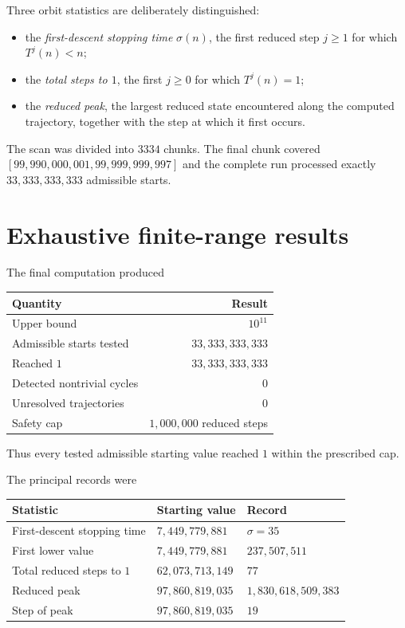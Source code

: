 \documentclass[11pt]{article}
\begin{document}
Three orbit statistics are deliberately distinguished:
\begin{itemize}[leftmargin=2em]
\item the \emph{first-descent stopping time} $\sigma(n)$, the first reduced step $j\ge1$ for which $T^j(n)<n$;
\item the \emph{total steps to $1$}, the first $j\ge0$ for which $T^j(n)=1$;
\item the \emph{reduced peak}, the largest reduced state encountered along the computed trajectory, together with the step at which it first occurs.
\end{itemize}
The scan was divided into $3334$ chunks. The final chunk covered $[99,990,000,001,99,999,999,997]$ and the complete run processed exactly $33,333,333,333$ admissible starts.

\section{Exhaustive finite-range results}
The final computation produced
\begin{center}
\begin{tabular}{lr}
\toprule
Quantity & Result\\
\midrule
Upper bound & $10^{11}$\\
Admissible starts tested & $33,333,333,333$\\
Reached $1$ & $33,333,333,333$\\
Detected nontrivial cycles & $0$\\
Unresolved trajectories & $0$\\
Safety cap & $1,000,000$ reduced steps\\
\bottomrule
\end{tabular}
\end{center}
Thus every tested admissible starting value reached $1$ within the prescribed cap.

The principal records were
\begin{center}
\begin{tabular}{lll}
\toprule
Statistic & Starting value & Record\\
\midrule
First-descent stopping time & $7,449,779,881$ & $\sigma=35$\\
First lower value & $7,449,779,881$ & $237,507,511$\\
Total reduced steps to $1$ & $62,073,713,149$ & $77$\\
Reduced peak & $97,860,819,035$ & $1,830,618,509,383$\\
Step of peak & $97,860,819,035$ & $19$\\
\bottomrule
\end{tabular}
\end{center}
\end{document}
